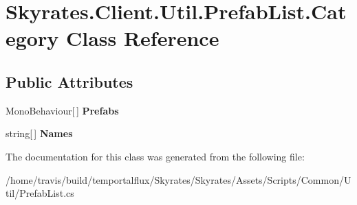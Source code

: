 \hypertarget{class_skyrates_1_1_client_1_1_util_1_1_prefab_list_1_1_category}{\section{Skyrates.\-Client.\-Util.\-Prefab\-List.\-Category Class Reference}
\label{class_skyrates_1_1_client_1_1_util_1_1_prefab_list_1_1_category}
}
\subsection*{Public Attributes}
\begin{DoxyCompactItemize}
\item 
\hypertarget{class_skyrates_1_1_client_1_1_util_1_1_prefab_list_1_1_category_aa0ca69165015153b0dc7864bb2402c85}{Mono\-Behaviour\mbox{[}$\,$\mbox{]} {\bfseries Prefabs}}\label{class_skyrates_1_1_client_1_1_util_1_1_prefab_list_1_1_category_aa0ca69165015153b0dc7864bb2402c85}

\item 
\hypertarget{class_skyrates_1_1_client_1_1_util_1_1_prefab_list_1_1_category_a2701777df4216c8b4ab9a7e201be19d5}{string\mbox{[}$\,$\mbox{]} {\bfseries Names}}\label{class_skyrates_1_1_client_1_1_util_1_1_prefab_list_1_1_category_a2701777df4216c8b4ab9a7e201be19d5}

\end{DoxyCompactItemize}


The documentation for this class was generated from the following file\-:\begin{DoxyCompactItemize}
\item 
/home/travis/build/temportalflux/\-Skyrates/\-Skyrates/\-Assets/\-Scripts/\-Common/\-Util/Prefab\-List.\-cs\end{DoxyCompactItemize}
